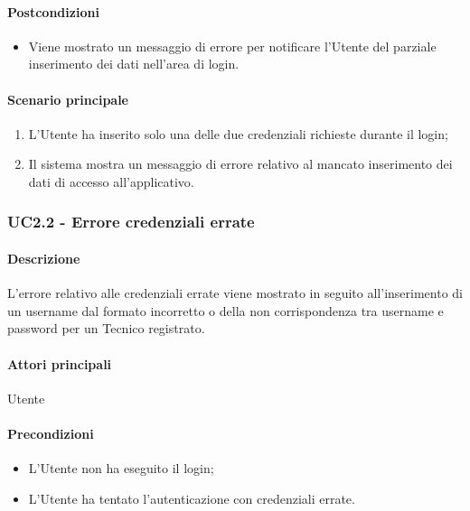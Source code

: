 \paragraph*{Postcondizioni}
\begin{itemize}
  \item Viene mostrato un messaggio di errore per notificare l’Utente del parziale inserimento dei dati nell’area di login.
\end{itemize}

\paragraph*{Scenario principale}
\begin{enumerate}
  \item L’Utente ha inserito solo una delle due credenziali richieste durante il login;
  \item Il sistema mostra un messaggio di errore relativo al mancato inserimento dei dati di accesso all’applicativo.   
\end{enumerate}


\subsubsection{UC2.2 - Errore credenziali errate}\label{UC2point2}
\paragraph*{Descrizione}
L’errore relativo alle credenziali errate viene mostrato in seguito all’inserimento di un username dal formato incorretto o della non corrispondenza tra username e password per un Tecnico registrato.

\paragraph*{Attori principali}
Utente

\paragraph*{Precondizioni}
\begin{itemize}
  \item L’Utente non ha eseguito il login;
  \item L’Utente ha tentato l’autenticazione con credenziali errate.  
\end{itemize}

